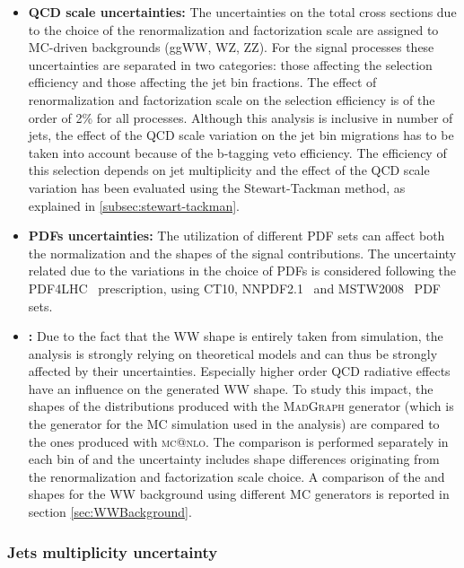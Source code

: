 \begin{itemize}

\item {\bf QCD scale uncertainties:}
  The uncertainties on the total cross sections due to the choice of the renormalization and factorization scale are assigned to MC-driven backgrounds (ggWW, WZ, ZZ).
  For the signal processes these uncertainties are separated in two categories: those affecting the selection efficiency and those affecting the jet bin fractions.
  The effect of renormalization and factorization scale on the selection efficiency is of the order of 2\% for all processes.
  Although this analysis is inclusive in number of jets, the effect of the QCD scale variation on the jet bin migrations has to be taken into account because of the b-tagging veto efficiency. The efficiency of this selection depends on jet multiplicity and the effect of the QCD scale variation has been evaluated using the Stewart-Tackman method, as explained in \ref{subsec:stewart-tackman}.

\item {\bf PDFs uncertainties:} 
  The utilization of different PDF sets can affect both the normalization and the shapes of the signal contributions. The uncertainty related due to the variations in the choice of PDFs is considered following the PDF4LHC~\cite{Alekhin:2011sk,Botje:2011sn} prescription, using CT10, NNPDF2.1~\cite{Ball:2011mu} and MSTW2008~\cite{Martin:2009iq} PDF sets.


\item {\bf {}:} 
  Due to the fact that the WW shape is entirely taken from simulation, the analysis is strongly
  relying on theoretical models and can thus be strongly affected by their uncertainties. Especially higher order QCD radiative effects have an influence on the generated WW shape. To study this impact, the shapes of the distributions produced with the \textsc{MadGraph} generator (which is the generator for the MC simulation used in the analysis) are compared to the ones produced with \textsc{mc@nlo}. The comparison is performed separately in each bin of \pth and the uncertainty includes shape differences originating from the renormalization and factorization scale choice. A comparison of the \mll and \mt shapes for the WW background using different MC generators is reported in section \ref{sec:WWBackground}.
\end{itemize} 

\subsubsection{Jets multiplicity uncertainty \label{subsec:stewart-tackman}}

